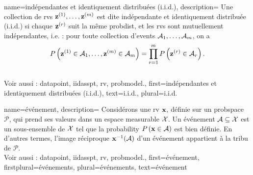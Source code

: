 {name={indépendantes et identiquement distribuées (i.i.d.)}, 
	description={
		Une collection de \glspl{rv} ${\bf z}^{(1)}, \ldots, {\bf z}^{(m)}$ est dite 
		indépendante et identiquement distribuée (i.i.d.) 
		si chaque ${\bf z}^{(r)}$ suit la même \gls{probdist}, et 
		les \glspl{rv} sont mutuellement indépendantes, i.e. : pour toute collection d’\glspl{event} 
		$\mathcal{A}_1, \ldots, \mathcal{A}_m$, on a
		\[
		P\left( {\bf z}^{(1)} \in \mathcal{A}_1, \ldots, {\bf z}^{(m)} \in \mathcal{A}_{m}\right) 
		= \prod_{r=1}^{m} P\left( {\bf z}^{(r)} \in \mathcal{A}_r\right).
		\]
		\\
		Voir aussi : \gls{datapoint}, \gls{iidasspt}, \gls{rv}, \gls{probmodel}.},
	first={indépendantes et identiquement distribuées (i.i.d.)},
	text={{i.i.d.}, plural={i.i.d.}} 
}

{name={événement}, 
	description={
		Considérons une \gls{rv} ${\bf x}$, définie sur un \gls{probspace} $\mathcal{P}$, 
		qui prend ses valeurs dans un espace \gls{measurable} $\mathcal{X}$. Un événement $\mathcal{A} \subseteq \mathcal{X}$ 
		est un sous-ensemble de $\mathcal{X}$ tel que la \gls{probability} 
		$P\left({\bf x} \in \mathcal{A}\right)$ est bien définie. En d’autres termes, l’image réciproque 
		${\bf x}^{-1}(\mathcal{A})$ d’un événement appartient à la tribu de $\mathcal{P}$. 
		\\
		Voir aussi : \gls{datapoint}, \gls{iidasspt}, \gls{rv}, \gls{probmodel}.},
	first={événement},
	firstplural={événements},
	plural={événements},
	text={événement} 
}

